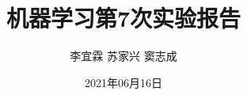 



\title{机器学习第7次实验报告}
\author{李宜霖 苏家兴 窦志成}
\date{2021年06月16日}
\maketitle

\newpage
\tableofcontents

\newpage






